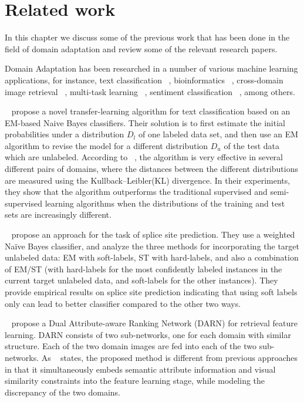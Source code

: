 \cleardoublepage

\chapter{Related work}
\label{relatedworkchapter}

In this chapter we discuss some of the previous work that has been done in the field of domain adaptation and review some of the relevant research papers.

Domain Adaptation has been researched in a number of various machine learning applications, for instance, text classification ~\citep{dai}, bioinformatics ~\citep{eval}, cross-domain image retrieval ~\citep{crossdomimage}, multi-task learning ~\citep{multitaskdeep}, sentiment classification ~\citep{sentmulti}, among others. 

~\citep{dai} propose a novel transfer-learning algorithm for text classification based on an EM-based Naive Bayes classifiers. Their solution is to first estimate the initial probabilities under a distribution $D_l$ of one labeled data set, and then use an EM algorithm to revise the model for a different distribution $D_u$ of the test data which are unlabeled. According to ~\citep{dai}, the algorithm is very effective in several different pairs of domains, where the distances between the different distributions are measured using the Kullback--Leibler(KL) divergence. In their experiments, they show that the algorithm outperforms the traditional supervised and semi-supervised learning algorithms when the distributions of the training and test sets are increasingly different.

~\citep{eval} propose an approach for the task of splice site prediction. They use a weighted Naïve Bayes classifier, and analyze the three methods for incorporating the target unlabeled data: EM with soft-labels, ST with hard-labels, and also a combination of EM/ST (with hard-labels for the most confidently labeled instances in the current target unlabeled data, and soft-labels for the other instances). They provide empirical results on splice site prediction indicating that using soft labels only can lead to better classifier compared to the other two ways.

~\citep{crossdomimage} propose a Dual Attribute-aware Ranking Network (DARN) for retrieval feature learning. DARN consists of two sub-networks, one for each domain with similar structure. Each of the two domain images are fed into each of the two sub-networks. As ~\citep{crossdomimage} states, the proposed method is different from previous approaches in that it simultaneously embeds semantic attribute information and visual similarity constraints into the feature learning stage, while modeling the discrepancy of the two domains. 

